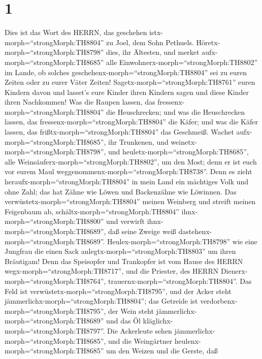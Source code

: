 \hypertarget{section}{%
\section{1}\label{section}}

 Dies ist das Wort des HERRN, das geschehen
istx-morph=``strongMorph:TH8804'' zu Joel, dem Sohn Pethuels.
 Höretx-morph=``strongMorph:TH8798'' dies, ihr Ältesten, und
merket aufx-morph=``strongMorph:TH8685'' alle
Einwohnerx-morph=``strongMorph:TH8802'' im Lande, ob solches
geschehenx-morph=``strongMorph:TH8804'' sei zu euren Zeiten oder zu
eurer Väter Zeiten!  Sagetx-morph=``strongMorph:TH8761''
euren Kindern davon und lasset's eure Kinder ihren Kindern sagen und
diese Kinder ihren Nachkommen!  Was die Raupen lassen, das
fressenx-morph=``strongMorph:TH8804'' die Heuschrecken; und was die
Heuschrecken lassen, das fressenx-morph=``strongMorph:TH8804'' die
Käfer; und was die Käfer lassen, das frißtx-morph=``strongMorph:TH8804''
das Geschmeiß.  Wachet aufx-morph=``strongMorph:TH8685'',
ihr Trunkenen, und weinetx-morph=``strongMorph:TH8798'', und
heuletx-morph=``strongMorph:TH8685'', alle
Weinsäuferx-morph=``strongMorph:TH8802'', um den Most; denn er ist euch
vor eurem Maul weggenommenx-morph=``strongMorph:TH8738''. 
Denn es zieht heraufx-morph=``strongMorph:TH8804'' in mein Land ein
mächtiges Volk und ohne Zahl; das hat Zähne wie Löwen und Backenzähne
wie Löwinnen.  Das verwüstetx-morph=``strongMorph:TH8804''
meinen Weinberg und streift meinen Feigenbaum ab,
schältx-morph=``strongMorph:TH8804'' ihnx-morph=``strongMorph:TH8800''
und verwirft ihnx-morph=``strongMorph:TH8689'', daß seine Zweige weiß
dastehenx-morph=``strongMorph:TH8689''. 
Heulex-morph=``strongMorph:TH8798'' wie eine Jungfrau die einen Sack
anlegtx-morph=``strongMorph:TH8803'' um ihren Bräutigam! 
Denn das Speisopfer und Trankopfer ist vom Hause des HERRN
wegx-morph=``strongMorph:TH8717'', und die Priester, des HERRN
Dienerx-morph=``strongMorph:TH8764'',
trauernx-morph=``strongMorph:TH8804''.  Das Feld ist
verwüstetx-morph=``strongMorph:TH8795'', und der Acker steht
jämmerlichx-morph=``strongMorph:TH8804''; das Getreide ist
verdorbenx-morph=``strongMorph:TH8795'', der Wein steht
jämmerlichx-morph=``strongMorph:TH8689'' und das Öl
kläglichx-morph=``strongMorph:TH8797''.  Die Ackerleute
sehen jämmerlichx-morph=``strongMorph:TH8685'', und die Weingärtner
heulenx-morph=``strongMorph:TH8685'' um den Weizen und die Gerste, daß
